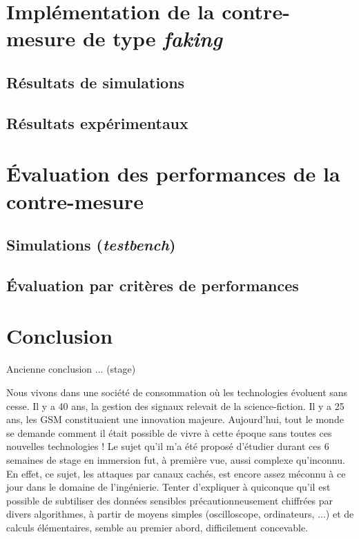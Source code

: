 \documentclass[oneside]{book}
\begin{document}
\newpage


\chapter{Implémentation de la contre-mesure de type \textit{faking}}
\label{chap:faking}

\section{Résultats de simulations}
\label{sec:Sim_results_Faking}

\section{Résultats expérimentaux}
\label{sec:Exp_Results_Faking}


\newpage


\chapter{Évaluation des performances de la contre-mesure}

\section{Simulations (\textit{testbench})}
\label{sec:EvalSim}

\section{Évaluation par critères de performances}
\label{sec:EvalPerf}

\newpage


\chapter{Conclusion}

Ancienne conclusion ... (stage)

Nous vivons dans une société de consommation où les technologies évoluent sans cesse. Il y a 40 ans, la gestion des signaux relevait de la science-fiction. Il y a 25 ans, les GSM constituaient une innovation majeure. Aujourd’hui, tout le monde se demande comment il était possible de vivre à cette époque sans toutes ces nouvelles technologies ! Le sujet qu'il m'a été proposé d'étudier durant ces 6 semaines de stage en immersion fut, à première vue, aussi complexe qu'inconnu. En effet, ce sujet, les attaques par canaux cachés, est encore assez méconnu à ce jour dans le domaine de l'ingénierie. Tenter d'expliquer à quiconque qu'il est possible de subtiliser des données sensibles précautionneusement chiffrées par divers algorithmes, à partir de moyens simples (oscilloscope, ordinateurs, ...) et de calculs élémentaires, semble au premier abord, difficilement concevable. 
\end{document}
